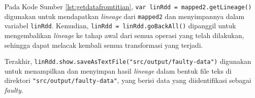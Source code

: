 \begin{enumerate}[topsep=0pt, itemsep=0pt]
\begin{itemize}
      

      Pada Kode Sumber \ref{lst:getdatafromtitian}, \texttt{var linRdd = mapped2.getLineage()} digunakan untuk mendapatkan \emph{lineage} dari \texttt{mapped2} dan menyimpannya dalam variabel \texttt{linRdd}. Kemudian, \texttt{linRdd = linRdd.goBackAll()} dipanggil untuk mengembalikan \emph{lineage} ke tahap awal dari semua operasi yang telah dilakukan, sehingga dapat melacak kembali semua transformasi yang terjadi. 
      
      Terakhir, \texttt{linRdd.show.saveAsTextFile("src/output/faulty-data")} digunakan untuk menampilkan dan menyimpan hasil \emph{lineage} dalam bentuk file teks di direktori \texttt{"src/output/faulty-data"}, yang berisi data yang diidentifikasi sebagai \emph{faulty}.
      \\
      \\

  \end{itemize}
\end{enumerate}

